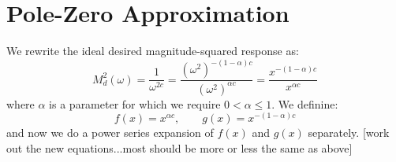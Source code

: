 \section{Pole-Zero Approximation}
We rewrite the ideal desired magnitude-squared response as:
\begin{equation}
M^2_d(\omega) = \frac{1}{\omega^{2c}} = \frac{(\omega^2)^{-(1-\alpha) c}}{(\omega^2)^{\alpha c}}
              = \frac{x^{-(1-\alpha) c}}{x^{\alpha c}}
\end{equation}
where $\alpha$ is a parameter for which we require $0 < \alpha \leq 1$. We definine:
\begin{equation}
f(x) = x^{\alpha c}, \qquad g(x) = x^{ -(1-\alpha) c}
\end{equation}
and now we do a power series expansion of $f(x)$ and $g(x)$ separately.
[work out the new equations...most should be more or less the same as above]











